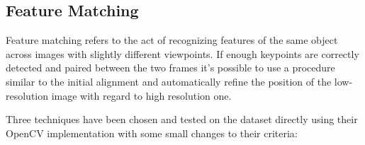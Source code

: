 \subsection {Feature Matching}
\label{subsec:feature_match}

Feature matching refers to the act of recognizing features of the same object across images with slightly different viewpoints\cite{feat_match}. If enough keypoints are correctly detected and paired between the two frames it's possible to use a procedure similar to the initial alignment and automatically refine the position of the low-resolution image with regard to high resolution one.

Three techniques have been chosen and tested on the dataset directly using their OpenCV implementation with some small changes to their criteria\cite{6126544}\cite{lowe1999object}\cite{6809191}\cite{DBLP:journals/corr/abs-1710-02726}:

